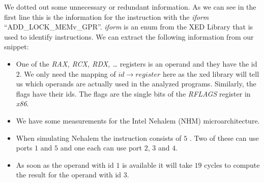 We dotted out some unnecessary or redundant information. As we can see in the first line this is the information for the instruction with the \emph{iform} ``ADD\_LOCK\_MEMv\_GPR''. \emph{iform} is an enum from the XED Library \cite{xed} that is used to identify instructions. We can extract the following information from our snippet:

\begin{itemize}
    \item One of the \emph{RAX, RCX, RDX, \dots} registers is an operand and they have the id $2$. We only need the mapping of $id \rightarrow register$ here as the xed library will tell us which operands are actually used in the analyzed programs. Similarly, the flags have their ids. The flags are the single bits of the \emph{RFLAGS} register in \emph{x86}.
    \item We have some measurements for the Intel Nehalem (NHM) microarchitecture.
    \item When simulating Nehalem the instruction consists of $5$ \microops. Two of these can use ports $1$ and $5$ and one each can use port $2$, $3$ and $4$.
    \item As soon as the operand with id $1$ is available it will take $19$ cycles to compute the result for the operand with id $3$.
\end{itemize}

